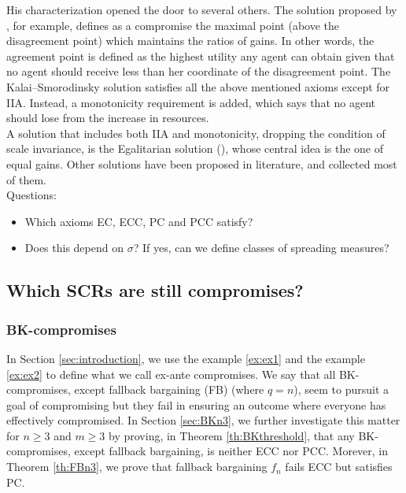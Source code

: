 \documentclass[version=3.21, pagesize, twoside=off, bibliography=totoc, DIV=calc, fontsize=12pt, a4paper]{scrartcl}
\begin{document}
His characterization opened the door to several others. The solution proposed by \cite{Kalai1975}, for example, defines as a compromise the maximal point (above the disagreement point) which maintains the ratios of gains. In other words, the agreement point is defined as the highest utility any agent can obtain given that no agent should receive less than her coordinate of the disagreement point.
The Kalai–Smorodinsky solution satisfies all the above mentioned axioms except for IIA. Instead, a monotonicity requirement is added, which says that no agent should lose from the increase in resources.
\\
A solution that includes both IIA and monotonicity, dropping the condition of scale invariance, is the Egalitarian solution (\cite{Kalai1977}), whose central idea is the one of equal gains.
\newline
Other solutions have been proposed in literature, and \cite{Thomson1994} collected most of them.
\newline\\
Questions:
\begin{itemize}
	\item Which axioms EC, ECC, PC and PCC satisfy?
	\item Does this depend on $\sigma$? If yes, can we define classes of spreading measures?
\end{itemize}

\subsection{Which SCRs are still compromises?}

\subsubsection{BK-compromises}
In Section \ref{sec:introduction}, we use the example \ref{ex:ex1} and the example \ref{ex:ex2} to define what we call \oquot ex-ante compromises\cquot. We say that all BK-compromises, except fallback bargaining (FB) (where $q=n$), seem to pursuit a goal of compromising but they fail in ensuring an outcome where everyone has effectively compromised. In Section \ref{sec:BKn3}, we further investigate this matter for $n\geq3$ and $m\geq3$ by proving, in Theorem \ref{th:BKthreshold}, that any BK-compromises, except fallback bargaining, is neither ECC nor PCC. Morever, in Theorem \ref{th:FBn3}, we prove that fallback bargaining $f_{n}$ fails ECC but satisfies PC.
\end{document}
